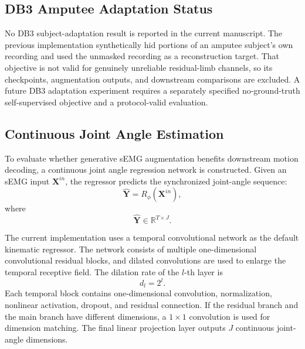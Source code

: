 \documentclass[journal]{IEEEtran}
\begin{document}
\subsection{DB3 Amputee Adaptation Status}
No DB3 subject-adaptation result is reported in the current manuscript.  The previous implementation synthetically hid portions of an amputee subject's own recording and used the unmasked recording as a reconstruction target.  That objective is not valid for genuinely unreliable residual-limb channels, so its checkpoints, augmentation outputs, and downstream comparisons are excluded.  A future DB3 adaptation experiment requires a separately specified no-ground-truth self-supervised objective and a protocol-valid evaluation.

\subsection{Continuous Joint Angle Estimation}
To evaluate whether generative sEMG augmentation benefits downstream motion decoding, a continuous joint angle regression network is constructed. Given an sEMG input $\mathbf{X}^{in}$, the regressor predicts the synchronized joint-angle sequence:
\begin{equation}
\hat{\mathbf{Y}} = R_{\phi}(\mathbf{X}^{in}),
\end{equation}
where
\begin{equation}
\hat{\mathbf{Y}} \in \mathbb{R}^{T \times J}.
\end{equation}

The current implementation uses a temporal convolutional network as the default kinematic regressor. The network consists of multiple one-dimensional convolutional residual blocks, and dilated convolutions are used to enlarge the temporal receptive field. The dilation rate of the $l$-th layer is
\begin{equation}
d_l=2^l.
\end{equation}
Each temporal block contains one-dimensional convolution, normalization, nonlinear activation, dropout, and residual connection. If the residual branch and the main branch have different dimensions, a $1\times 1$ convolution is used for dimension matching. The final linear projection layer outputs $J$ continuous joint-angle dimensions.
\end{document}
